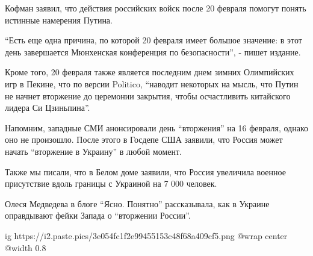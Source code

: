 Кофман заявил, что действия российских войск после 20 февраля помогут понять
истинные намерения Путина.

\enquote{Есть еще одна причина, по которой 20 февраля имеет большое значение: в этот
день завершается Мюнхенская конференция по безопасности}, - пишет издание.

Кроме того, 20 февраля также является последним днем зимних Олимпийских игр в
Пекине, что по версии Politico, \enquote{наводит некоторых на мысль, что Путин не
начнет вторжение до церемонии закрытия, чтобы осчастливить китайского лидера Си
Цзиньпина}.

Напомним, западные СМИ анонсировали день \enquote{вторжения} на 16 февраля, однако оно
не произошло. После этого в Госдепе США заявили, что Россия может начать
\enquote{вторжение в Украину} в любой момент.

Также мы писали, что в Белом доме заявили, что Россия увеличила военное
присутствие вдоль границы с Украиной на 7 000 человек.

Олеся Медведева в блоге \enquote{Ясно. Понятно} рассказывала, как в Украине оправдывают
фейки Запада о \enquote{вторжении России}. 

\ifcmt
  ig https://i2.paste.pics/3e054fc1f2e99455153c48f68a409cf5.png
  @wrap center
  @width 0.8
\fi
